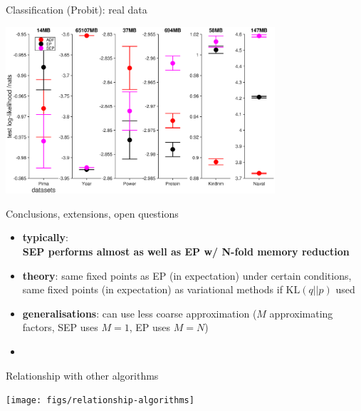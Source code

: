 \documentclass[mathserif]{beamer}
\begin{document}
\begin{frame}{Classification (Probit): real data }
  \begin{overprint}
   \centerline{\includegraphics[width=10cm]{figs/sep_dnn_real_data}}
  \end{overprint}
\end{frame}

\begin{frame}{Conclusions, extensions, open questions}
\begin{itemize}
\item \textbf{typically}:\\ {\color{blue}\textbf{SEP performs almost as well as EP w/ N-fold memory reduction  }}
\item \textbf{theory}: same fixed points as EP (in expectation) under certain conditions, same fixed points (in expectation) as variational methods if $\text{KL}(q||p)$ used
\item \textbf{generalisations}: can use less coarse approximation ($M$ approximating factors, SEP uses $M=1$, EP uses $M=N$)
\item {}
\end{itemize}
\end{frame}



\begin{frame}{Relationship with other algorithms}
  \begin{overprint}
   \centerline{\texttt{[image: figs/relationship-algorithms]}}
  \end{overprint}
\end{frame}
\end{document}
